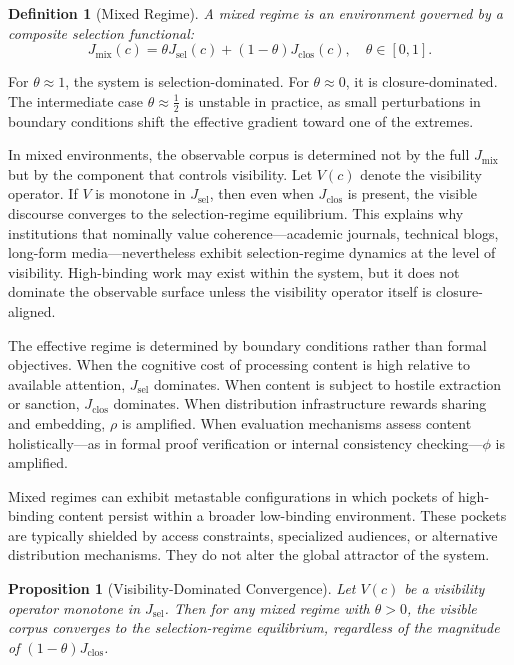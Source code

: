 \documentclass[12pt]{article}
\newtheorem{proposition}{Proposition}[section]
\newtheorem{definition}{Definition}[section]
\newcommand{\bind}{\phi}
\newcommand{\recomp}{\rho}
\newcommand{\Jsel}{J_{\mathrm{sel}}}
\newcommand{\Jclos}{J_{\mathrm{clos}}}
\newcommand{\Jmix}{J_{\mathrm{mix}}}
\begin{document}
\begin{definition}[Mixed Regime]
\label{def:mixed}
A \emph{mixed regime} is an environment governed by a composite
selection functional:
\[
\Jmix(c) = \theta \Jsel(c) + (1-\theta)\Jclos(c),
\quad \theta \in [0,1].
\]
\end{definition}

For $\theta \approx 1$, the system is selection-dominated. For
$\theta \approx 0$, it is closure-dominated. The intermediate case
$\theta \approx \tfrac{1}{2}$ is unstable in practice, as small
perturbations in boundary conditions shift the effective gradient toward
one of the extremes.

In mixed environments, the observable corpus is determined not by the
full $\Jmix$ but by the component that controls visibility. Let $V(c)$
denote the visibility operator. If $V$ is monotone in $\Jsel$, then
even when $\Jclos$ is present, the visible discourse converges to the
selection-regime equilibrium. This explains why institutions that
nominally value coherence---academic journals, technical blogs, long-form
media---nevertheless exhibit selection-regime dynamics at the level of
visibility. High-binding work may exist within the system, but it does
not dominate the observable surface unless the visibility operator
itself is closure-aligned.

The effective regime is determined by boundary conditions rather than
formal objectives. When the cognitive cost of processing content is high
relative to available attention, $\Jsel$ dominates. When content is
subject to hostile extraction or sanction, $\Jclos$ dominates. When
distribution infrastructure rewards sharing and embedding, $\recomp$ is
amplified. When evaluation mechanisms assess content holistically---as
in formal proof verification or internal consistency checking---$\bind$
is amplified.

Mixed regimes can exhibit metastable configurations in which pockets of
high-binding content persist within a broader low-binding environment.
These pockets are typically shielded by access constraints, specialized
audiences, or alternative distribution mechanisms. They do not alter the
global attractor of the system.

\begin{proposition}[Visibility-Dominated Convergence]
\label{prop:visibility}
Let $V(c)$ be a visibility operator monotone in $\Jsel$. Then for any
mixed regime with $\theta > 0$, the visible corpus converges to the
selection-regime equilibrium, regardless of the magnitude of
$(1-\theta)\Jclos$.
\end{proposition}
\end{document}

